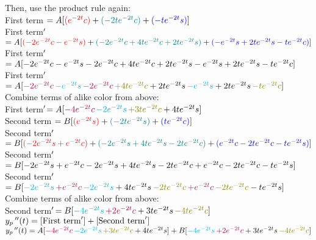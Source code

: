 \documentclass{article}
\begin{document}
\begin{enumerate}
Then, use the product rule again:\\
First term $= A[\textcolor{red}{(e\sp{-2t}c)} + \textcolor{teal}{(-2te\sp{-2t}c)} + \textcolor{blue}{(- te\sp{-2t}s)}]$\\
First term$\sp\prime$$=A[\textcolor{red}{(-2e\sp{-2t}c - e\sp{-2t}s)} + \textcolor{teal}{(- 2e\sp{-2t}c + 4te\sp{-2t}c + 2te\sp{-2t}s)} + \textcolor{blue}{(- e\sp{-2t}s + 2te\sp{-2t}s - te\sp{-2t}c)} ]$\\
First term$\sp\prime$$=A[-2e\sp{-2t}c - e\sp{-2t}s - 2e\sp{-2t}c + 4te\sp{-2t}c + 2te\sp{-2t}s - e\sp{-2t}s + 2te\sp{-2t}s - te\sp{-2t}c ]$\\
First term$\sp\prime$$=A[\textcolor{purple}{-2e\sp{-2t}c}\,\textcolor{cyan}{- e\sp{-2t}s}\,\textcolor{purple}{-2e\sp{-2t}c}\,\textcolor{olive}{+4te\sp{-2t}c} + 2te\sp{-2t}s\,\textcolor{cyan}{-e\sp{-2t}s} + 2te\sp{-2t}s\,\textcolor{olive}{-te\sp{-2t}c} ]$\\
Combine terms of alike color from above:\\
First term$\sp\prime$$=A[\textcolor{purple}{-4e\sp{-2t}c}\,\textcolor{cyan}{-2e\sp{-2t}s}\,\textcolor{olive}{+ 3te\sp{-2t}c} + 4te\sp{-2t}s ]$\\

Second term $= B[\textcolor{red}{(e\sp{-2t}s)} + \textcolor{teal}{(-2te\sp{-2t}s)} + \textcolor{blue}{(te\sp{-2t}c)}]$\\
Second term$\sp\prime$$= B[\textcolor{red}{(-2e\sp{-2t}s+e\sp{-2t}c)} + \textcolor{teal}{(-2e\sp{-2t}s + 4te\sp{-2t}s - 2te\sp{-2t}c)} + \textcolor{blue}{(e\sp{-2t}c - 2te\sp{-2t}c - te\sp{-2t}s)}]$\\
Second term$\sp\prime$$= B[-2e\sp{-2t}s+e\sp{-2t}c - 2e\sp{-2t}s + 4te\sp{-2t}s - 2te\sp{-2t}c + e\sp{-2t}c - 2te\sp{-2t}c - te\sp{-2t}s]$\\
Second term$\sp\prime$$= B[\textcolor{cyan}{-2e\sp{-2t}s}\,\textcolor{purple}{+e\sp{-2t}c}\,\textcolor{cyan}{-2e\sp{-2t}s} + 4te\sp{-2t}s\,\textcolor{olive}{-2te\sp{-2t}c}\,\textcolor{purple}{+ e\sp{-2t}c}\,\textcolor{olive}{- 2te\sp{-2t}c} - te\sp{-2t}s]$\\
Combine terms of alike color from above:\\
Second term$\sp\prime$$= B[\textcolor{cyan}{-4e\sp{-2t}s}\,\textcolor{purple}{+2e\sp{-2t}c} + 3te\sp{-2t}s\,\textcolor{olive}{-4te\sp{-2t}c} ]$\\

$y_p\,\sp{\prime\prime}(t) = [\text{First term}\sp\prime] + [\text{Second term}\sp\prime]$\\
$y_p\,\sp{\prime\prime}(t) = A[\textcolor{purple}{-4e\sp{-2t}c}\,\textcolor{cyan}{-2e\sp{-2t}s}\,\textcolor{olive}{+ 3te\sp{-2t}c} + 4te\sp{-2t}s ] + B[\textcolor{cyan}{-4e\sp{-2t}s}\,\textcolor{purple}{+2e\sp{-2t}c} + 3te\sp{-2t}s\,\textcolor{olive}{-4te\sp{-2t}c} ]$\\


\end{enumerate}
\end{document}
